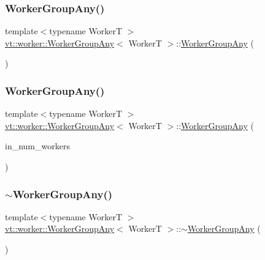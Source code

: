 \subsubsection{\texorpdfstring{Worker\+Group\+Any()}{WorkerGroupAny()}\hspace{0.1cm}{\footnotesize\ttfamily [1/2]}}
{\footnotesize\ttfamily template$<$typename WorkerT $>$ \\
\hyperlink{structvt_1_1worker_1_1_worker_group_any}{vt\+::worker\+::\+Worker\+Group\+Any}$<$ WorkerT $>$\+::\hyperlink{structvt_1_1worker_1_1_worker_group_any}{Worker\+Group\+Any} (\begin{DoxyParamCaption}{ }\end{DoxyParamCaption})}

\mbox{\label{structvt_1_1worker_1_1_worker_group_any_ab3857978c11fd6578d786d0c42a2e784}} 
\subsubsection{\texorpdfstring{Worker\+Group\+Any()}{WorkerGroupAny()}\hspace{0.1cm}{\footnotesize\ttfamily [2/2]}}
{\footnotesize\ttfamily template$<$typename WorkerT $>$ \\
\hyperlink{structvt_1_1worker_1_1_worker_group_any}{vt\+::worker\+::\+Worker\+Group\+Any}$<$ WorkerT $>$\+::\hyperlink{structvt_1_1worker_1_1_worker_group_any}{Worker\+Group\+Any} (\begin{DoxyParamCaption}\item[{\hyperlink{namespacevt_aa93398ea48f2cb6c188512250f7cc248}{Worker\+Count\+Type} const \&}]{in\+\_\+num\+\_\+workers }\end{DoxyParamCaption})}

\mbox{\label{structvt_1_1worker_1_1_worker_group_any_a2427146b080679942534b8723475ade3}} 
\subsubsection{\texorpdfstring{$\sim$\+Worker\+Group\+Any()}{~WorkerGroupAny()}}
{\footnotesize\ttfamily template$<$typename WorkerT $>$ \\
\hyperlink{structvt_1_1worker_1_1_worker_group_any}{vt\+::worker\+::\+Worker\+Group\+Any}$<$ WorkerT $>$\+::$\sim$\hyperlink{structvt_1_1worker_1_1_worker_group_any}{Worker\+Group\+Any} (\begin{DoxyParamCaption}{ }\end{DoxyParamCaption})\hspace{0.3cm}{\ttfamily [virtual]}}



